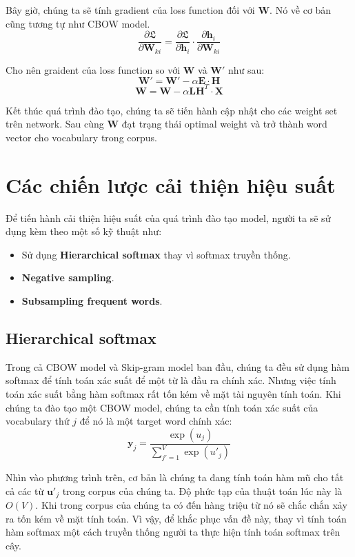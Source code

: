 \documentclass[12pt]{article}
\newcommand{\itemsizePaddingLeft}{\setlength{\itemindent}{0.6cm}}
\begin{document}
\indent Bây giờ, chúng ta sẽ tính gradient của loss function đối với $\boldsymbol{W}$. Nó về cơ bản cũng tương tự như CBOW model.
$$\dfrac{\partial \mathfrak{L}}{\partial \boldsymbol{W}_{ki}} = \dfrac{\partial \mathfrak{L}}{\partial \boldsymbol{h}_i} \cdot \dfrac{\partial \boldsymbol{h}_i}{\partial \boldsymbol{W}_{ki}}$$

\indent Cho nên graident của loss function so với $\boldsymbol{W}$ và $\boldsymbol{W'}$ như sau:
$$\boldsymbol{W'} = \boldsymbol{W'} - \alpha \boldsymbol{E} \cdot \boldsymbol{H}$$
$$\boldsymbol{W} = \boldsymbol{W} - \alpha \boldsymbol{LH}^T \cdot \boldsymbol{X}$$

\indent Kết thúc quá trình đào tạo, chúng ta sẽ tiến hành cập nhật cho các weight set trên network. Sau cùng $\boldsymbol{W}$ đạt trạng thái optimal weight và trở thành word vector cho vocabulary trong corpus.

\section{Các chiến lược cải thiện hiệu suất}
Để tiến hành cải thiện hiệu suất của quá trình đào tạo model, người ta sẽ sử dụng kèm theo một số kỹ thuật như:
\begin{itemize}
  \itemsizePaddingLeft
  \item Sử dụng \textbf{Hierarchical softmax} thay vì softmax truyền thống.
  \item \textbf{Negative sampling}.
  \item \textbf{Subsampling frequent words}.
\end{itemize}

\subsection{Hierarchical softmax}
Trong cả CBOW model và Skip-gram model ban đầu, chúng ta đều sử dụng hàm softmax để tính toán xác suất để một từ là đầu ra chính xác. Nhưng việc tính toán xác suất bằng hàm softmax rất tốn kém về mặt tài nguyên tính toán. Khi chúng ta đào tạo một CBOW model, chúng ta cần tính toán xác suất của vocabulary thứ $j$ để nó là một target word chính xác:
$$\boldsymbol{y}_j = \dfrac{\exp{(u_j)}}{\sum^V_{j'=1} \exp{(u'_j)}}$$

\indent Nhìn vào phương trình trên, cơ bản là chúng ta đang tính toán hàm mũ cho tất cả các từ $\boldsymbol{u'}_j$ trong corpus của chúng ta. Độ phức tạp của thuật toán lúc này là $O(V)$. Khi trong corpus của chúng ta có đến hàng triệu từ nó sẽ chắc chắn xảy ra tốn kém về mặt tính toán. Vì vậy, để khắc phục vấn đề này, thay vì tính toán hàm softmax một cách truyền thống người ta thực hiện tính toán softmax trên cây.\\
\end{document}

